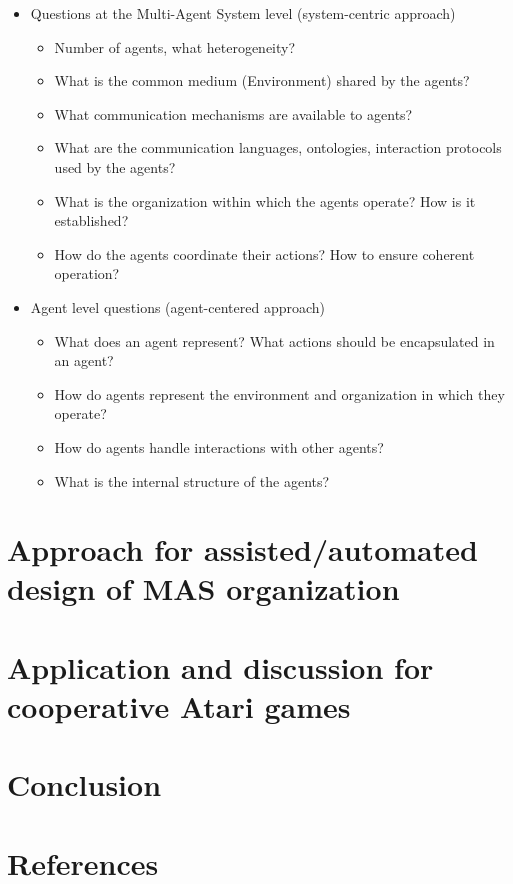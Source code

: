 \documentclass[runningheads]{llncs}
\begin{document}
\begin{itemize}
    \item Questions at the Multi-Agent System level (system-centric approach)
          \begin{itemize}
              \item Number of agents, what heterogeneity?
              \item What is the common medium (Environment) shared by the agents?
              \item What communication mechanisms are available to agents?
              \item What are the communication languages, ontologies, interaction protocols used by the agents?
              \item What is the organization within which the agents operate? How is it established?
              \item How do the agents coordinate their actions? How to ensure coherent operation?
          \end{itemize}
          
    \item Agent level questions (agent-centered approach)
          \begin{itemize}
              \item What does an agent represent? What actions should be encapsulated in an agent?
              \item How do agents represent the environment and organization in which they operate?
              \item How do agents handle interactions with other agents?
              \item What is the internal structure of the agents?
          \end{itemize}
\end{itemize}

\section{Approach for assisted/automated design of MAS organization}

\section{Application and discussion for cooperative Atari games}


\section{Conclusion}

%
%
%
% 
% 
%
\section*{References}

% 



\end{document}
